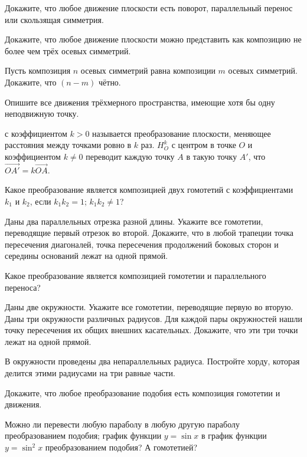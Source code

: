 \documentclass[a4paper,12pt]{article}
\begin{document}
Докажите, что любое движение плоскости есть поворот, параллельный перенос или скользящая симметрия.

Докажите, что любое движение плоскости можно представить как композицию не более чем трёх осевых симметрий.

Пусть композиция $n$ осевых симметрий равна композиции $m$ осевых симметрий. Докажите, что $(n-m)$ чётно.

Опишите все движения трёхмерного пространства, имеющие хотя бы одну неподвижную точку.

\newpage


 с коэффициентом $k>0$ называется преобразование плоскости, меняющее расстояния между точками ровно в $k$ раз.  $H_O^k$ с центром в точке $O$ и коэффициентом $k\neq 0$ переводит каждую точку $A$ в такую точку $A'$, что $\overrightarrow {OA'} = k\overrightarrow {OA}$.

Какое преобразование является композицией двух гомотетий с коэффициентами $k_1$ и $k_2$, если
 $k_1 k_2 = 1$;
 $k_1 k_2 \ne 1$?

Даны два параллельных отрезка разной длины. Укажите все гомотетии, переводящие первый отрезок во второй.
Докажите, что в любой трапеции точка пересечения диагоналей, точка пересечения продолжений боковых сторон и середины оснований лежат на одной прямой.

Какое преобразование является композицией гомотетии и параллельного переноса?

Даны две окружности. Укажите все гомотетии, переводящие первую во вторую.
Даны три окружности различных радиусов. Для каждой пары окружностей нашли точку пересечения их общих внешних касательных. Докажите, что эти три точки лежат на
одной прямой.

В окружности проведены два непараллельных радиуса. Постройте хорду, которая делится этими радиусами на три равные части.

Докажите, что любое преобразование подобия есть композиция гомотетии и движения.

Можно ли перевести
любую параболу в любую другую параболу преобразованием подобия;
график функции $y=\sin x$ в график функции $y=\sin^2 x$ преобразованием подобия? А гомотетией?
\end{document}

